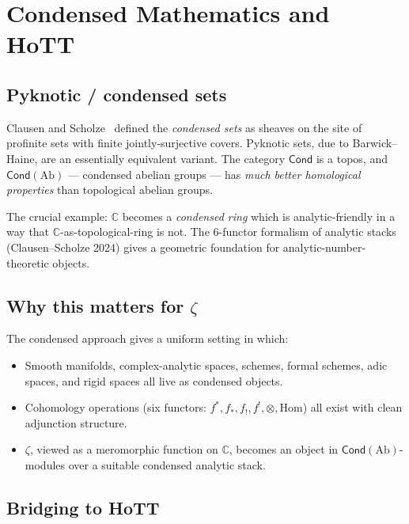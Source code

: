 \documentclass[12pt]{article}
\theoremstyle{definition}
\theoremstyle{remark}
\newcommand{\C}{\mathbb{C}}
\begin{document}
\section{Condensed Mathematics and HoTT}\label{sec:condensed}

\subsection{Pyknotic / condensed sets}

Clausen and Scholze~\cite{Scholze2019Condensed,ClausenScholze2024Analytic}
defined the \emph{condensed sets} as sheaves on the site of profinite sets
with finite jointly-surjective covers. Pyknotic sets, due to Barwick--Haine,
are an essentially equivalent variant. The category $\mathsf{Cond}$ is a
topos, and $\mathsf{Cond}(\mathrm{Ab})$ — condensed abelian groups — has
\emph{much better homological properties} than topological abelian groups.

The crucial example: $\C$ becomes a \emph{condensed ring} which is
analytic-friendly in a way that $\C$-as-topological-ring is not. The
6-functor formalism of analytic stacks (Clausen--Scholze 2024) gives a
geometric foundation for analytic-number-theoretic objects.

\subsection{Why this matters for \texorpdfstring{$\zeta$}{zeta}}

The condensed approach gives a uniform setting in which:
\begin{itemize}
\item Smooth manifolds, complex-analytic spaces, schemes, formal schemes,
adic spaces, and rigid spaces all live as condensed objects.
\item Cohomology operations (six functors: $f^*, f_*, f_!, f^!, \otimes,
\mathrm{Hom}$) all exist with clean adjunction structure.
\item $\zeta$, viewed as a meromorphic function on $\C$, becomes an object
in $\mathsf{Cond}(\mathrm{Ab})$-modules over a suitable condensed analytic
stack.
\end{itemize}

\subsection{Bridging to HoTT}
\end{document}
